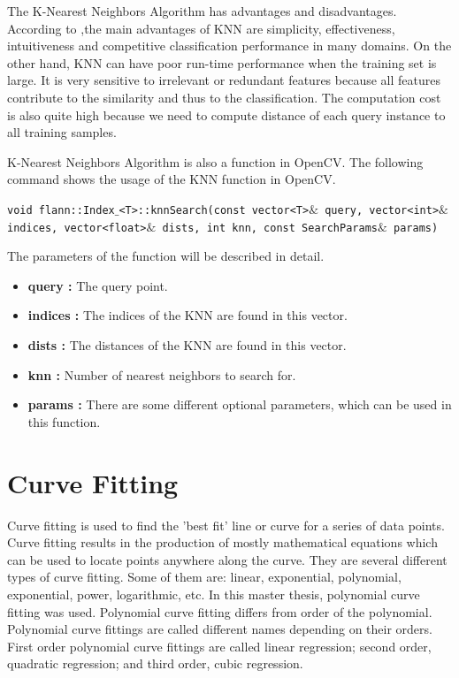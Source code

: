 The K-Nearest Neighbors Algorithm has advantages and disadvantages. According to \cite{k_nearest_neighbors_adv_disadv},the main advantages of KNN are simplicity, effectiveness, intuitiveness and competitive classification performance in many domains. On the other hand, KNN can have poor run-time performance when the training set is large. It is very sensitive to irrelevant or redundant features because all features contribute to the similarity and thus to the classification. The computation cost is also quite high because we need to compute distance of each query instance to all training samples. 

K-Nearest Neighbors Algorithm is also a function in OpenCV. The following command shows the usage of the KNN function in OpenCV.

\begin{center}

\texttt{void flann::Index$\_$<T>::knnSearch(const vector<T>$\&$ query, vector<int>$\&$ indices, vector<float>$\&$ dists, int knn, const SearchParams$\&$ params)}

\end{center}

The parameters of the function will be described in detail.\cite{k_nearest_neighbors_OpenCV}

\begin{itemize}

\item \textbf{query : }The query point.

\item \textbf{indices : }The indices of the KNN are found in this vector.

\item \textbf{dists : }The distances of the KNN are found in this vector.

\item \textbf{knn : }Number of nearest neighbors to search for.

\item \textbf{params : }There are some different optional parameters, which can be used in this function.

\end{itemize}


%
\section{Curve Fitting}\label{sec:Curve Fitting}

Curve fitting is used to find the 'best fit' line or curve for a series of data points. Curve fitting results in the production of mostly mathematical equations which can be used to locate points anywhere along the curve. They are several different types of curve fitting. Some of them are\cite{Curve_Fitting}: linear, exponential, polynomial, exponential, power, logarithmic, etc. In this master thesis, polynomial curve fitting was used. Polynomial curve fitting differs from order of the polynomial. Polynomial curve fittings are called different names depending on their orders. First order polynomial curve fittings are called linear regression; second order, quadratic regression; and third order, cubic regression.


